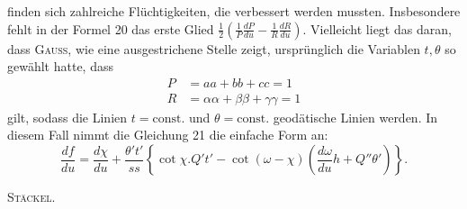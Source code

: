 %
finden sich zahlreiche Flüchtigkeiten, die verbessert werden mussten. Insbesondere fehlt in der Formel 20 das erste Glied $\tfrac12\left(\frac1P\frac{dP}{du}-\frac1R\frac{dR}{du}\right)$. Vielleicht liegt das daran, dass \textsc{Gauss}, wie eine ausgestrichene Stelle zeigt, ursprünglich die Variablen $t,\theta$ so gewählt hatte, dass
\[
\begin{aligned}
P&=aa+bb+cc=1\\
R&=\alpha\alpha+\beta\beta+\gamma\gamma=1
\end{aligned}
\]
gilt, sodass die Linien $t=\text{const.}$ und $\theta=\text{const.}$ geodätische Linien werden. In diesem Fall nimmt die Gleichung 21 die einfache Form an:
\[
\frac{df}{du}=\frac{d\chi}{du}+\frac{\theta't'}{ss}\left\{\cot\chi.Q't'-\cot(\omega-\chi)\left(\frac{d\omega}{du}h+Q''\theta'\right)\right\}.
\]
\begin{flushright}\textsc{Stäckel.}\end{flushright}

